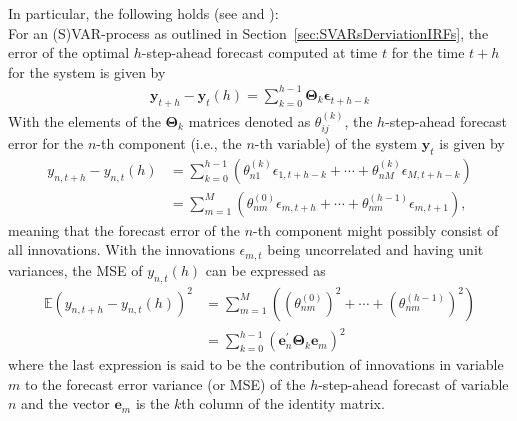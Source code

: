 \documentclass[a4paper,11pt,listof=nochaptergap,oneside,pointednumbers,bibtotoc,bigheadings,liststotoc,hidelinks]{scrbook}
\theoremstyle{mysatz}
\theoremstyle{mydefinition}
\theoremstyle{mytheorem}
\theoremstyle{mybemerkung}
\newcommand{\vect}[1]{\boldsymbol{\mathbf{#1}}}
\begin{document}
In particular, the following holds (see \citet{lutkepohl:05} and \citet{lutkepohlkilian:17}):\\
For an (S)VAR-process as outlined in Section~\ref{sec:SVARsDerviationIRFs}, the error of the optimal $h$-step-ahead forecast computed at time $t$ for the time $t+h$ for the system is given by 
\begin{equation} \label{eq:FVED1}
\begin{split}
 		\vect{y}_{t+h} - \vect{y}_t(h) = \sum\limits_{k=0}^{h-1} \vect{\Theta}_k\vect{\epsilon}_{t+h-k}
\end{split}								
\end{equation}
With the elements of the $\vect{\Theta}_k$ matrices denoted as $\theta_{ij}^{(k)}$, the $h$-step-ahead forecast error for the $n$-th component (i.e., the $n$-th variable) of the system $\vect{y}_{t}$ is given by 
\begin{equation} \label{eq:FVED2}
\begin{split}
 		y_{n, t+h} - y_{n, t}(h) & = \sum\limits_{k=0}^{h-1} (\theta_{n1}^{(k)}\epsilon_{1, t+h-k} + \cdots + \theta_{nM}^{(k)}\epsilon_{M, t+h-k})\\
						& = \sum\limits_{m=1}^{M} (\theta_{nm}^{(0)}\epsilon_{m, t+h} + \cdots + \theta_{nm}^{(h-1)}\epsilon_{m, t+1}),
\end{split}								
\end{equation}
meaning that the forecast error of the $n$-th component might possibly consist of all innovations. With the innovations $\epsilon_{m,t}$ being uncorrelated and having unit variances, the MSE of $y_{n, t}(h)$ can be expressed as
\begin{equation} \label{eq:FVED3}
\begin{split}
 		\mathbb{E}(y_{n, t+h} - y_{n, t}(h))^2 & =  \sum\limits_{m=1}^{M} \left((\theta_{nm}^{(0)} )^2+ \cdots + (\theta_{nm}^{(h-1)})^2\right) \\
		& =  \sum\limits_{k=0}^{h-1} (\vect{e}_n^'\vect{\Theta}_k\vect{e}_m)^2
\end{split}								
\end{equation}
where the last expression is said to be the contribution of innovations in variable $m$ to the forecast error variance (or MSE) of the $h$-step-ahead forecast of variable $n$ and the vector $\vect{e}_m$ is the $k$th column of the identity matrix.
\end{document}
